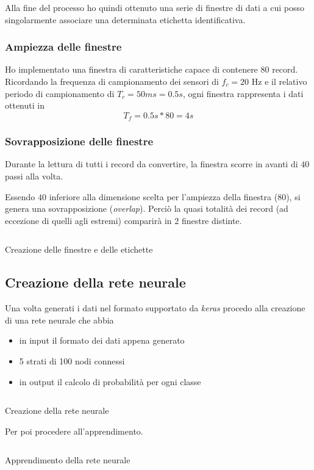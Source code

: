 Alla fine del processo ho quindi ottenuto una serie di finestre di dati a cui posso singolarmente associare una determinata
etichetta identificativa.

\subsubsection{Ampiezza delle finestre}
Ho implementato una finestra di caratteristiche capace di contenere $80$ record. Ricordando la frequenza di 
campionamento dei sensori di $f_c = 20$ Hz e il relativo periodo di campionamento di $T_c = 50ms = 0.5s$, ogni finestra rappresenta i dati ottenuti in 
$$T_f = 0.5s * 80 = 4s$$

\subsubsection{Sovrapposizione delle finestre}
Durante la lettura di tutti i record da convertire, la finestra scorre in avanti di $40$ passi alla volta.

Essendo $40$ inferiore alla dimensione scelta per l'ampiezza della finestra ($80$), si genera una sovrapposizione (\textit{overlap}).
Perciò la quasi totalità dei record (ad eccezione di quelli agli estremi) comparirà in 2 finestre distinte.

\begin{listing}[H] 
    \inputminted[frame=single,framesep=10pt]{python}{assets/snippets/classifier/create_segments_and_labels.py}
    \caption{Creazione delle finestre e delle etichette}
\end{listing}


\newpage
\subsection{Creazione della rete neurale}
Una volta generati i dati nel formato supportato da \textit{keras} procedo alla creazione di 
una rete neurale che abbia
\begin{itemize}
    \item in input il formato dei dati appena generato
    \item 5 strati di 100 nodi connessi
    \item in output il calcolo di probabilità per ogni classe
\end{itemize}
\begin{listing}[H] 
    \inputminted[frame=single,framesep=10pt]{python}{assets/snippets/classifier/dnn_create.py}
    \caption{Creazione della rete neurale}
\end{listing}
Per poi procedere all'apprendimento.
\begin{listing}[H] 
    \inputminted[frame=single,framesep=10pt]{python}{assets/snippets/classifier/dnn_fit.py}
    \caption{Apprendimento della rete neurale}
\end{listing}


